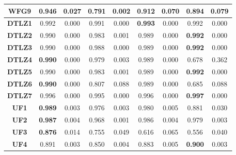 \begin{table*}[t]
\begin{tabular}{c c|c|c|c|c|c|c|c}
\textbf{WFG9}  & \textbf{0.946}      & 0.027            & 0.791             & 0.002           & 0.912              & 0.070           & 0.894              & 0.079            \\ \hline
\textbf{DTLZ1} & 0.992               & 0.000            & 0.991             & 0.000           & \textbf{0.993}     & 0.000           & 0.992              & 0.000            \\ \hline
\textbf{DTLZ2} & 0.990               & 0.000            & 0.983             & 0.001           & 0.989              & 0.000           & \textbf{0.992}     & 0.000            \\ \hline
\textbf{DTLZ3} & 0.990               & 0.000            & 0.988             & 0.000           & 0.989              & 0.000           & \textbf{0.992}     & 0.000            \\ \hline
\textbf{DTLZ4} & \textbf{0.990}      & 0.000            & 0.979             & 0.003           & 0.989              & 0.000           & 0.678              & 0.362            \\ \hline
\textbf{DTLZ5} & 0.990               & 0.000            & 0.983             & 0.001           & 0.989              & 0.000           & \textbf{0.992}     & 0.000            \\ \hline
\textbf{DTLZ6} & \textbf{0.990}      & 0.000            & 0.807             & 0.088           & 0.989              & 0.000           & 0.685              & 0.088            \\ \hline
\textbf{DTLZ7} & 0.996               & 0.000            & 0.995             & 0.000           & 0.996              & 0.000           & \textbf{0.997}     & 0.000            \\ \hline
\textbf{UF1}   & \textbf{0.989}      & 0.003            & 0.976             & 0.003           & 0.980              & 0.005           & 0.881              & 0.030            \\ \hline
\textbf{UF2}   & \textbf{0.987}      & 0.004            & 0.968             & 0.001           & 0.986              & 0.004           & 0.979              & 0.003            \\ \hline
\textbf{UF3}   & \textbf{0.876}      & 0.014            & 0.755             & 0.049           & 0.616              & 0.065           & 0.556              & 0.040            \\ \hline
\textbf{UF4}   & 0.891               & 0.003            & 0.850             & 0.004           & 0.883              & 0.005           & \textbf{0.900}     & 0.003            \\ \hline

\end{tabular}
\end{table*}

